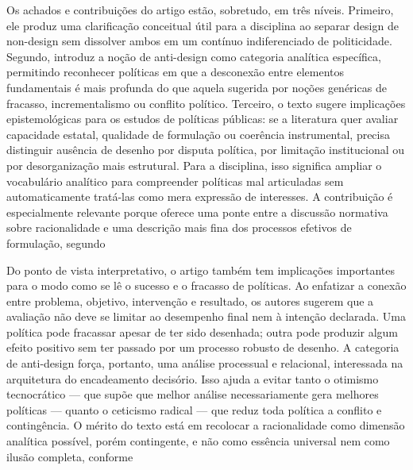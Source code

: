 \documentclass[12pt,a4paper]{article}
\begin{document}
Os achados e contribuições do artigo estão, sobretudo, em três níveis. Primeiro, ele produz uma clarificação conceitual útil para a disciplina ao separar design de non-design sem dissolver ambos em um contínuo indiferenciado de politicidade. Segundo, introduz a noção de anti-design como categoria analítica específica, permitindo reconhecer políticas em que a desconexão entre elementos fundamentais é mais profunda do que aquela sugerida por noções genéricas de fracasso, incrementalismo ou conflito político. Terceiro, o texto sugere implicações epistemológicas para os estudos de políticas públicas: se a literatura quer avaliar capacidade estatal, qualidade de formulação ou coerência instrumental, precisa distinguir ausência de desenho por disputa política, por limitação institucional ou por desorganização mais estrutural. Para a disciplina, isso significa ampliar o vocabulário analítico para compreender políticas mal articuladas sem automaticamente tratá-las como mera expressão de interesses. A contribuição é especialmente relevante porque oferece uma ponte entre a discussão normativa sobre racionalidade e uma descrição mais fina dos processos efetivos de formulação, segundo\parencite{newman2020_policy_design}

Do ponto de vista interpretativo, o artigo também tem implicações importantes para o modo como se lê o sucesso e o fracasso de políticas. Ao enfatizar a conexão entre problema, objetivo, intervenção e resultado, os autores sugerem que a avaliação não deve se limitar ao desempenho final nem à intenção declarada. Uma política pode fracassar apesar de ter sido desenhada; outra pode produzir algum efeito positivo sem ter passado por um processo robusto de desenho. A categoria de anti-design força, portanto, uma análise processual e relacional, interessada na arquitetura do encadeamento decisório. Isso ajuda a evitar tanto o otimismo tecnocrático — que supõe que melhor análise necessariamente gera melhores políticas — quanto o ceticismo radical — que reduz toda política a conflito e contingência. O mérito do texto está em recolocar a racionalidade como dimensão analítica possível, porém contingente, e não como essência universal nem como ilusão completa, conforme\parencite{newman2020_policy_design}
\end{document}
